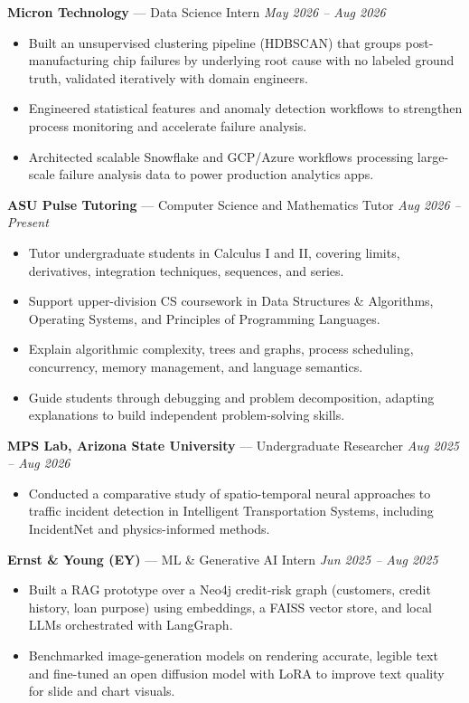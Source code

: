 \documentclass[a4paper,8pt]{extarticle}
\begin{document}
\noindent
\textbf{Micron Technology} --- Data Science Intern
\hfill \textit{May 2026 -- Aug 2026}

\begin{itemize}
\item Built an unsupervised clustering pipeline (HDBSCAN) that groups post-manufacturing chip failures by underlying root cause with no labeled ground truth, validated iteratively with domain engineers.
\item Engineered statistical features and anomaly detection workflows to strengthen process monitoring and accelerate failure analysis.
\item Architected scalable Snowflake and GCP/Azure workflows processing large-scale failure analysis data to power production analytics apps.
\end{itemize}

\noindent
\textbf{ASU Pulse Tutoring} --- Computer Science and Mathematics Tutor
\hfill \textit{Aug 2026 -- Present}

\begin{itemize}
\item Tutor undergraduate students in Calculus I and II, covering limits, derivatives, integration techniques, sequences, and series.
\item Support upper-division CS coursework in Data Structures \& Algorithms, Operating Systems, and Principles of Programming Languages.
\item Explain algorithmic complexity, trees and graphs, process scheduling, concurrency, memory management, and language semantics.
\item Guide students through debugging and problem decomposition, adapting explanations to build independent problem-solving skills.
\end{itemize}

\noindent
\textbf{MPS Lab, Arizona State University} --- Undergraduate Researcher
\hfill \textit{Aug 2025 -- Aug 2026}

\begin{itemize}
\item Conducted a comparative study of spatio-temporal neural approaches to traffic incident detection in Intelligent Transportation Systems, including IncidentNet and physics-informed methods.
\end{itemize}

\noindent
\textbf{Ernst \& Young (EY)} --- ML \& Generative AI Intern
\hfill \textit{Jun 2025 -- Aug 2025}

\begin{itemize}
\item Built a RAG prototype over a Neo4j credit-risk graph (customers, credit history, loan purpose) using embeddings, a FAISS vector store, and local LLMs orchestrated with LangGraph.
\item Benchmarked image-generation models on rendering accurate, legible text and fine-tuned an open diffusion model with LoRA to improve text quality for slide and chart visuals.
\end{itemize}
\end{document}

